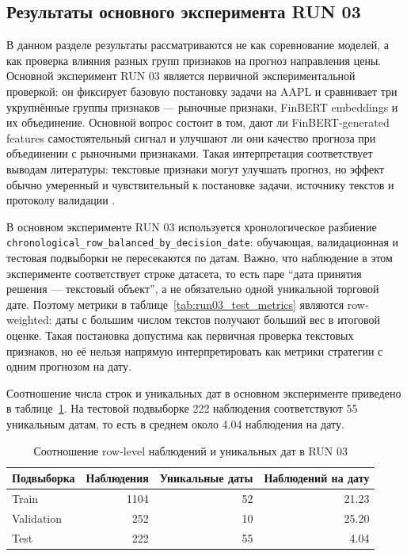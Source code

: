 \subsection{Результаты основного эксперимента RUN 03}

В данном разделе результаты рассматриваются не как соревнование моделей, а как проверка влияния разных групп признаков на прогноз направления цены. Основной эксперимент RUN 03 является первичной экспериментальной проверкой: он фиксирует базовую постановку задачи на AAPL и сравнивает три укрупнённые группы признаков --- рыночные признаки, FinBERT embeddings и их объединение. Основной вопрос состоит в том, дают ли FinBERT-generated features самостоятельный сигнал и улучшают ли они качество прогноза при объединении с рыночными признаками. Такая интерпретация соответствует выводам литературы: текстовые признаки могут улучшать прогноз, но эффект обычно умеренный и чувствительный к постановке задачи, источнику текстов и протоколу валидации \cite{hiew2019bert,zou2022prebit,albada2025bertweet}.

В основном эксперименте RUN 03 используется хронологическое разбиение \texttt{chronological\_row\_balanced\_by\_decision\_date}: обучающая, валидационная и тестовая подвыборки не пересекаются по датам. Важно, что наблюдение в этом эксперименте соответствует строке датасета, то есть паре ``дата принятия решения --- текстовый объект'', а не обязательно одной уникальной торговой дате. Поэтому метрики в таблице~\ref{tab:run03_test_metrics} являются row-weighted: даты с большим числом текстов получают больший вес в итоговой оценке. Такая постановка допустима как первичная проверка текстовых признаков, но её нельзя напрямую интерпретировать как метрики стратегии с одним прогнозом на дату.

Соотношение числа строк и уникальных дат в основном эксперименте приведено в таблице~\ref{tab:run03_rows_dates}. На тестовой подвыборке 222 наблюдения соответствуют 55 уникальным датам, то есть в среднем около 4.04 наблюдения на дату.

\begin{table}[H]
\centering
\begin{tabular}{lrrr}
\toprule
Подвыборка & Наблюдения & Уникальные даты & Наблюдений на дату \\
\midrule
Train & 1104 & 52 & 21.23 \\
Validation & 252 & 10 & 25.20 \\
Test & 222 & 55 & 4.04 \\
\bottomrule
\end{tabular}
\caption{Соотношение row-level наблюдений и уникальных дат в RUN 03}
\label{tab:run03_rows_dates}
\end{table}

